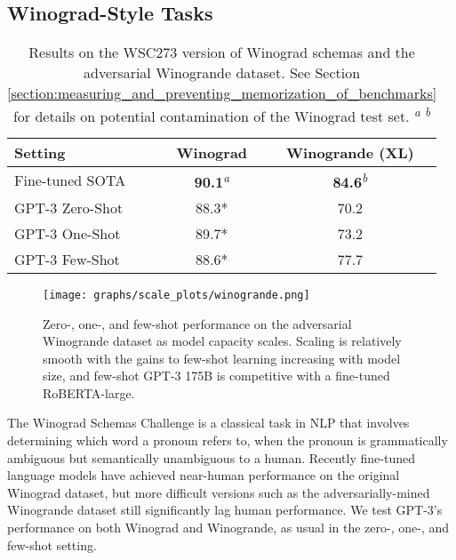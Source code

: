 \documentclass{article}
\begin{document}
     
    \subsection{Winograd-Style Tasks}
    \label{section:Winograd-Style_Tasks}
    \begin{table}
    \centering
    \begin{center}
        \begin{tabular}{l c c}
        \toprule
        Setting & Winograd & Winogrande (XL) \\ 
        \midrule
        Fine-tuned SOTA  & \textbf{90.1}\textsuperscript{\textit{a}}  & \textbf{84.6}\textsuperscript{\textit{b}} \\ 
        GPT-3 Zero-Shot  & 88.3* & 70.2 \\
        GPT-3 One-Shot & 89.7* & 73.2 \\
        GPT-3 Few-Shot  & 88.6* & 77.7 \\
        \bottomrule
        \end{tabular}
    \end{center}
    \caption{Results on the WSC273 version of Winograd schemas and the adversarial Winogrande dataset. See Section \ref{section:measuring_and_preventing_memorization_of_benchmarks} for details on potential contamination of the Winograd test set. \textsuperscript{\textit{a}}\cite{sakaguchi2019winogrande}
    \textsuperscript{\textit{b}}\cite{lin2020tttttackling}
    }
    \label{table:winograd}
\end{table} \begin{figure}
\centering\texttt{[image: graphs/scale\_plots/winogrande.png]}
\caption{Zero-, one-, and few-shot performance on the adversarial Winogrande dataset as model capacity scales.  Scaling is relatively smooth with the gains to few-shot learning increasing with model size, and few-shot GPT-3 175B is competitive with a fine-tuned RoBERTA-large.}
\label{graph:winogrande}
\end{figure} The Winograd Schemas Challenge \cite{levesque2012winograd} is a classical task in NLP that involves determining which word a pronoun refers to, when the pronoun is grammatically ambiguous but semantically unambiguous to a human.  Recently fine-tuned language models have achieved near-human performance on the original Winograd dataset, but more difficult versions such as the adversarially-mined Winogrande dataset \cite{sakaguchi2019winogrande} still significantly lag human performance.  We test GPT-3’s performance on both Winograd and Winogrande, as usual in the zero-, one-, and few-shot setting.
\end{document}
